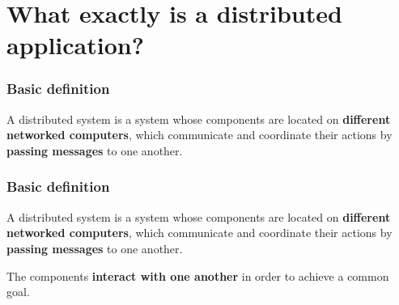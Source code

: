 \section{What exactly is a distributed application?}
\frame{\tableofcontents[currentsection]}

\begin{frame}
    \frametitle{Basic definition}
    A distributed system is a system whose components are located on \textbf{different networked computers}, which communicate and coordinate their actions by \textbf{passing messages} to one another.
    
    \vfill
    
\end{frame}

\begin{frame}
    \frametitle{Basic definition}
    A distributed system is a system whose components are located on \textbf{different networked computers}, which communicate and coordinate their actions by \textbf{passing messages} to one another.
    
    \vfill
    
    The components \textbf{interact with one another} in order to achieve a common goal.
\end{frame}

